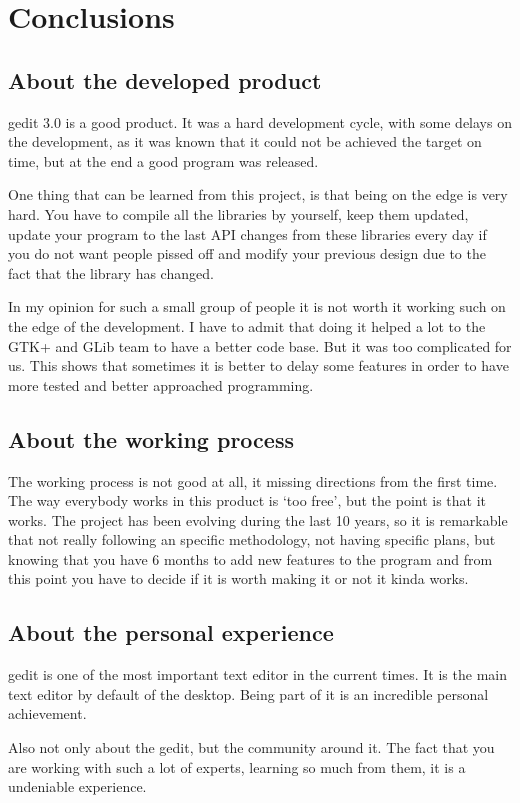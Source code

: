 
\chapter{Conclusions}

\section{About the developed product}

gedit 3.0 is a good product. It was a hard development cycle, with some delays on the development, as it was known that it could not be achieved the  target on time, but at the end a good program was released.

One thing that can be learned from this project, is that being on the edge is very hard. You have to compile all the libraries by yourself, keep them updated, update your program to the last API changes from these libraries every day if you do not want people pissed off and modify your previous design due to the fact that the library has changed.

In my opinion for such a small group of people it is not worth it working such on the edge of the development. I have to admit that doing it helped a lot to the GTK+ and GLib team to have a better code base. But it was too complicated for us. This shows that sometimes it is better to delay some features in order to have more tested and better approached programming.

\section{About the working process}

The working process is not good at all, it missing directions from the first time. The way everybody works in this product is `too free', but the point is that it works. The project has been evolving during the last 10 years, so it is remarkable that not really following an specific methodology, not having specific plans, but knowing that you have 6 months to add new features to the program and from this point you have to decide if it is worth making it or not it kinda works.

\newpage
\section{About the personal experience}

gedit is one of the most important text editor in the current times. It is the main text editor by default of the \GNOME desktop. Being part of it is an incredible personal achievement.

Also not only about the gedit, but the community around it. The fact that you are working with such a lot of experts, learning so much from them, it is a undeniable experience.
